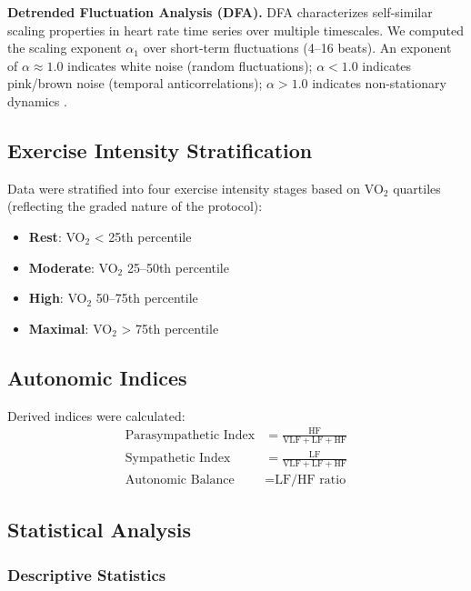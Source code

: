 \documentclass[12pt,a4paper]{article}
\begin{document}
\textbf{Detrended Fluctuation Analysis (DFA).} DFA characterizes self-similar scaling properties in heart rate time series over multiple timescales. We computed the scaling exponent $\alpha_1$ over short-term fluctuations (4--16 beats). An exponent of $\alpha \approx 1.0$ indicates white noise (random fluctuations); $\alpha < 1.0$ indicates pink/brown noise (temporal anticorrelations); $\alpha > 1.0$ indicates non-stationary dynamics \cite{Peng1994, Goldberger2002}.

\subsection*{Exercise Intensity Stratification}

Data were stratified into four exercise intensity stages based on VO$_2$ quartiles (reflecting the graded nature of the protocol):
\begin{itemize}
    \item \textbf{Rest}: VO$_2$ < 25th percentile
    \item \textbf{Moderate}: VO$_2$ 25--50th percentile
    \item \textbf{High}: VO$_2$ 50--75th percentile
    \item \textbf{Maximal}: VO$_2$ > 75th percentile
\end{itemize}

\subsection*{Autonomic Indices}

Derived indices were calculated:
\begin{align}
    \text{Parasympathetic Index} &= \frac{\text{HF}}{\text{VLF} + \text{LF} + \text{HF}} \\
    \text{Sympathetic Index} &= \frac{\text{LF}}{\text{VLF} + \text{LF} + \text{HF}} \\
    \text{Autonomic Balance} &= \text{LF/HF ratio}
\end{align}

\subsection*{Statistical Analysis}

\subsubsection*{Descriptive Statistics}
\end{document}
